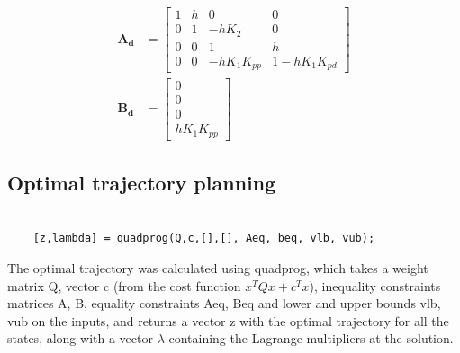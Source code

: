 \begin{subequations}

    \begin{align}

        \mathbf{A_d} &= \begin{bmatrix}

        1 & h & 0 & 0\\

        0 & 1 & -hK_2 & 0\\

        0 & 0 & 1 & h\\

        0 & 0 & -hK_1K_{pp} & 1-hK_1K_{pd}

        \end{bmatrix}\\

        \mathbf{B_d} &= \begin{bmatrix}

        0\\

        0\\

        0\\

        hK_1K_{pp}

    \end{bmatrix}

    \end{align}

\end{subequations}



\subsection{Optimal trajectory planning}

\begin{lstlisting}

    [z,lambda] = quadprog(Q,c,[],[], Aeq, beq, vlb, vub);

\end{lstlisting}



The optimal trajectory was calculated using quadprog, which takes a weight matrix Q, vector c (from the cost function $x^TQx + c^Tx$), inequality constraints matrices A, B, equality constraints Aeq, Beq and lower and upper bounds vlb, vub on the inputs, and returns a vector z with the optimal trajectory for all the states, along with a vector $\lambda$ containing the Lagrange multipliers at the solution.



